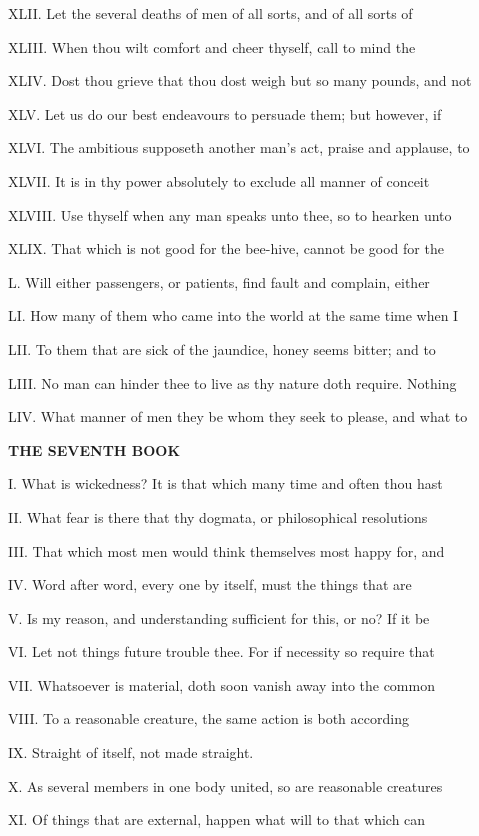 XLII. Let the several deaths of men of all
sorts, and of all sorts of

XLIII. When thou wilt comfort and cheer
thyself, call to mind the

XLIV. Dost thou grieve that thou dost weigh
but so many pounds, and not

XLV. Let us do our best endeavours to persuade
them; but however, if

XLVI. The ambitious supposeth another man's
act, praise and applause, to

XLVII. It is in thy power absolutely to
exclude all manner of conceit

XLVIII. Use thyself when any man speaks unto
thee, so to hearken unto

XLIX. That which is not good for the bee-hive,
cannot be good for the

L. Will either passengers, or patients, find
fault and complain, either

LI. How many of them who came into the world
at the same time when I

LII. To them that are sick of the jaundice,
honey seems bitter; and to

LIII. No man can hinder thee to live as thy
nature doth require. Nothing

LIV. What manner of men they be whom they seek
to please, and what to

\textbf{THE SEVENTH BOOK}

I. What is wickedness? It is that which many
time and often thou hast

II. What fear is there that thy dogmata, or
philosophical resolutions

III. That which most men would think
themselves most happy for, and

IV. Word after word, every one by itself, must
the things that are

V. Is my reason, and understanding sufficient
for this, or no? If it be

VI. Let not things future trouble thee. For if
necessity so require that

VII. Whatsoever is material, doth soon vanish
away into the common

VIII. To a reasonable creature, the same
action is both according

IX. Straight of itself, not made straight.

X. As several members in one body united, so
are reasonable creatures

XI. Of things that are external, happen what
will to that which can

